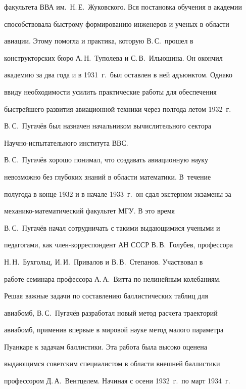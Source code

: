 факультета ВВА им.\ Н.\,Е.~Жуковского. Вся постановка обучения в академии 


способствовала быстрому формированию инженеров и ученых в области 


авиации. Этому помогла и практика, которую В.\,С.\ прошел в 


конструкторских бюро А.\,Н.~Туполева и С.\,В.~Ильюшина. Он окончил 


академию за два года и в 1931~г.\ был оставлен в ней адъюнктом. Однако 


ввиду необходимости усилить практические работы для обеспечения 


быстрейшего развития авиационной техники через полгода летом 1932~г.\ 


В.\,С.~Пугачёв был назначен начальником вычислительного сектора 


     На\-уч\-но-ис\-пы\-та\-тель\-но\-го института ВВС.


     


     В.\,С.~Пугачёв хорошо понимал, что создавать авиационную науку 


невозможно без глубоких знаний в области математики. В~течение 


полугода в конце 1932 и в начале 1933~г.\ он сдал экстерном экзамены за 


     ме\-ха\-ни\-ко-ма\-те\-ма\-ти\-че\-ский факультет МГУ. В это время 


В.\,С.~Пугачёв начал сотрудничать с такими вы\-да\-ющи\-ми\-ся учеными и 


педагогами, как член-корреспондент АН СССР В.\,В.~Голубев, профессора 


Н.\,Н.~Бухгольц, И.\,И.~Привалов и В.\,В.~Степанов. Участвовал в 


работе семинара профессора А.\,А.~Витта по нелинейным колебаниям.


     


     Решая важные задачи по составлению баллистических таблиц для 


авиабомб, В.\,С.~Пугачёв разработал новый метод расчета траекторий 


авиабомб, применив впервые в мировой науке метод малого параметра 


Пуанкаре к задачам баллистики. Эта работа была высоко оценена 


выдающимся советским специалистом в области внешней баллистики 


профессором Д.\,А.~Вентцелем. Начиная с осени 1932~г.\ по март 1934~г.\ 


